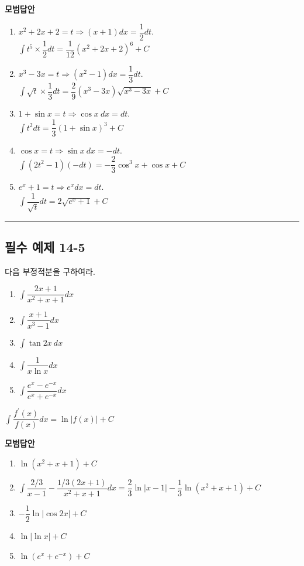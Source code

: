 \documentclass[a4paper,11pt]{article}
\begin{document}
\textbf{모범답안}
\begin{enumerate}[label=(\arabic*)]
    \item $x^{2}+2x+2=t \Rightarrow (x+1)dx=\dfrac{1}{2}dt$. \\ $\int t^{5}\times\dfrac{1}{2}dt=\dfrac{1}{12}(x^{2}+2x+2)^{6}+C$
    \item $x^{3}-3x=t \Rightarrow (x^{2}-1)dx=\dfrac{1}{3}dt$. \\ $\int\sqrt{t}\times\dfrac{1}{3}dt=\dfrac{2}{9}(x^{3}-3x)\sqrt{x^{3}-3x}+C$
    \item $1+\sin x=t \Rightarrow \cos x~dx=dt$. \\ $\int t^{2}dt=\dfrac{1}{3}(1+\sin x)^{3}+C$
    \item $\cos x=t \Rightarrow \sin x~dx=-dt$.\\ $\int(2t^{2}-1)(-dt)=-\dfrac{2}{3}\cos^{3}x+\cos x+C$
    \item $e^{x}+1=t \Rightarrow e^{x}dx=dt$. \\ $\int\dfrac{1}{\sqrt{t}}dt=2\sqrt{e^{x}+1}+C$
\end{enumerate}

\vspace{0.5cm}
\hrule
\vspace{0.5cm}

\subsection*{필수 예제 14-5}
다음 부정적분을 구하여라.
\begin{enumerate}[label=(\arabic*)]
    \item $\int\dfrac{2x+1}{x^{2}+x+1}dx$
    \item $\int\dfrac{x+1}{x^{3}-1}dx$
    \item $\int\tan 2x~dx$
    \item $\int\dfrac{1}{x\ln x}dx$
    \item $\int\dfrac{e^{x}-e^{-x}}{e^{x}+e^{-x}}dx$
\end{enumerate}

\begin{studybox}
$\int\dfrac{f^{\prime}(x)}{f(x)}dx=\ln|f(x)|+C$
\end{studybox}

\textbf{모범답안}
\begin{enumerate}[label=(\arabic*)]
    \item $\ln(x^{2}+x+1)+C$
    \item $\int\dfrac{2/3}{x-1}-\dfrac{1/3(2x+1)}{x^{2}+x+1}dx=\dfrac{2}{3}\ln|x-1|-\dfrac{1}{3}\ln(x^{2}+x+1)+C$
    \item $-\dfrac{1}{2}\ln|\cos 2x|+C$
    \item $\ln|\ln x|+C$
    \item $\ln(e^{x}+e^{-x})+C$
\end{enumerate}
\end{document}
